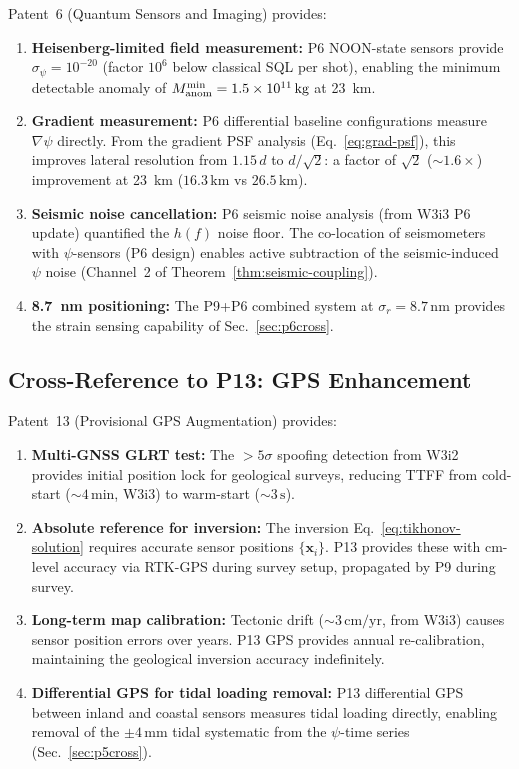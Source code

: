 \documentclass[aps,prd,twocolumn,superscriptaddress,nofootinbib]{revtex4-2}
\newcommand{\km}{\,\mathrm{km}}
\begin{document}
Patent~6 (Quantum Sensors and Imaging) provides:
\begin{enumerate}
\item \textbf{Heisenberg-limited field measurement:} P6 NOON-state
  sensors provide $\sigma_\psi = 10^{-20}$ (factor $10^6$ below
  classical SQL per shot), enabling the minimum detectable anomaly
  of $M_{\rm anom}^{\min} = 1.5\times10^{11}\,\mathrm{kg}$ at 23~km.

\item \textbf{Gradient measurement:} P6 differential baseline
  configurations measure $\nabla\psi$ directly.  From the gradient
  PSF analysis (Eq.~\ref{eq:grad-psf}), this improves lateral
  resolution from $1.15\,d$ to $d/\sqrt{2}$: a factor of $\sqrt{2}$
  ($\sim 1.6\times$) improvement at 23~km
  ($16.3\km$ vs $26.5\km$).

\item \textbf{Seismic noise cancellation:} P6 seismic noise analysis
  (from W3i3 P6 update) quantified the $h(f)$ noise floor.
  The co-location of seismometers with $\psi$-sensors (P6 design)
  enables active subtraction of the seismic-induced $\psi$ noise
  (Channel~2 of Theorem~\ref{thm:seismic-coupling}).

\item \textbf{8.7~nm positioning:} The P9+P6 combined system at
  $\sigma_r = 8.7\,\mathrm{nm}$ provides the strain sensing
  capability of Sec.~\ref{sec:p6cross}.
\end{enumerate}

\subsection{Cross-Reference to P13: GPS Enhancement}
\label{sec:p13cross}

Patent~13 (Provisional GPS Augmentation) provides:
\begin{enumerate}
\item \textbf{Multi-GNSS GLRT test:} The $>5\sigma$ spoofing detection
  from W3i2 provides initial position lock for geological surveys,
  reducing TTFF from cold-start ($\sim 4\,\mathrm{min}$, W3i3) to
  warm-start ($\sim 3\,\mathrm{s}$).

\item \textbf{Absolute reference for inversion:} The inversion
  Eq.~\eqref{eq:tikhonov-solution} requires accurate sensor positions
  $\{\mathbf{x}_i\}$.  P13 provides these with cm-level accuracy
  via RTK-GPS during survey setup, propagated by P9 during survey.

\item \textbf{Long-term map calibration:} Tectonic drift
  ($\sim 3\,\mathrm{cm/yr}$, from W3i3) causes sensor position
  errors over years.  P13 GPS provides annual re-calibration,
  maintaining the geological inversion accuracy indefinitely.

\item \textbf{Differential GPS for tidal loading removal:}
  P13 differential GPS between inland and coastal sensors measures
  tidal loading directly, enabling removal of the $\pm 4\,\mathrm{mm}$
  tidal systematic from the $\psi$-time series (Sec.~\ref{sec:p5cross}).
\end{enumerate}
\end{document}
